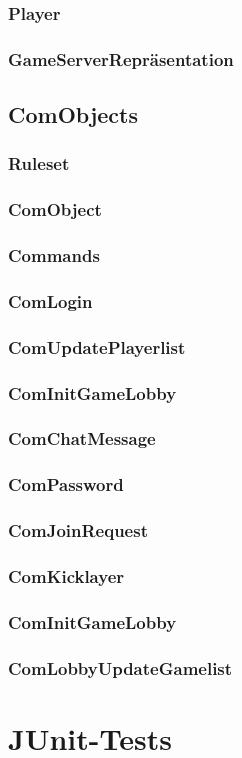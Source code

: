\documentclass{article}
\begin{document}
\subsubsection{Player}
\subsubsection{GameServerRepräsentation}
\newpage

\subsection{ComObjects}
\subsubsection{Ruleset}
\subsubsection{ComObject}
\subsubsection{Commands}
\subsubsection{ComLogin}
\subsubsection{ComUpdatePlayerlist}
\subsubsection{ComInitGameLobby}
\subsubsection{ComChatMessage}
\subsubsection{ComPassword}
\subsubsection{ComJoinRequest}
\subsubsection{ComKicklayer}
\subsubsection{ComInitGameLobby}
\subsubsection{ComLobbyUpdateGamelist}
\newpage

\section{JUnit-Tests}
		
\end{document}
